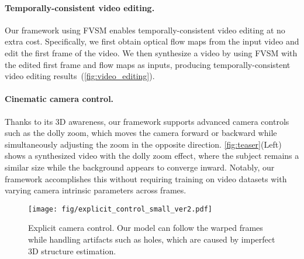 \paragraph{Temporally-consistent video editing.}
Our framework using FVSM enables temporally-consistent video editing at no extra cost.
Specifically, we first obtain optical flow maps from the input video and edit the first frame of the video.
We then synthesize a video by using FVSM with the edited first frame and flow maps as inputs, producing temporally-consistent video editing results~(\cref{fig:video_editing}).





\vspace{-4mm}
\paragraph{Cinematic camera control.}
Thanks to its 3D awareness, our framework supports advanced camera controls such as the dolly zoom, which moves the camera forward or backward while simultaneously adjusting the zoom in the opposite direction.
\cref{fig:teaser}(Left) shows a synthesized video with the dolly zoom effect, where the subject remains a similar size while the background appears to converge inward.
Notably, our framework accomplishes this without requiring training on video datasets with varying camera intrinsic parameters across frames.








\begin{figure}[!t]
\centering
\texttt{[image: fig/explicit\_control\_small\_ver2.pdf]}
\vspace{-6mm}
\caption{
Explicit camera control. Our model can follow the warped frames while handling artifacts such as holes, which are caused by imperfect 3D structure estimation.
}
\vspace{-2mm}
\label{fig:explicit_control}
\end{figure}



